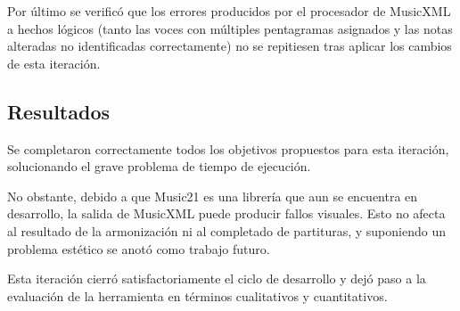 Por último se verificó que los errores producidos por el procesador de MusicXML a hechos lógicos (tanto las voces con múltiples pentagramas asignados y las notas alteradas no identificadas correctamente) no se repitiesen tras aplicar los cambios de esta iteración.

\subsection{Resultados}
Se completaron correctamente todos los objetivos propuestos para esta iteración, solucionando el grave problema de tiempo de ejecución.

No obstante, debido a que Music21 es una librería que aun se encuentra en desarrollo, la salida de MusicXML puede producir fallos visuales. Esto no afecta al resultado de la armonización ni al completado de partituras, y suponiendo un problema estético se anotó como trabajo futuro.

Esta iteración cierró satisfactoriamente el ciclo de desarrollo y dejó paso a la evaluación de la herramienta en términos cualitativos y cuantitativos.
